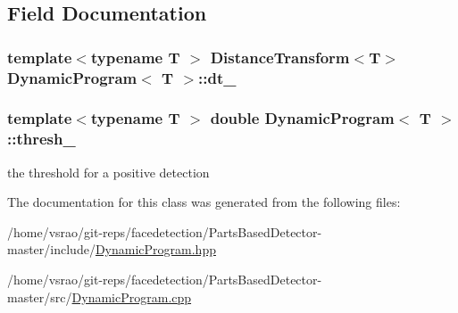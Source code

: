 \subsection{Field Documentation}
\hypertarget{classDynamicProgram_a6cea0b8559d6a03d81e2003991ab67cf}{
\subsubsection[{dt\-\_\-}]{\setlength{\rightskip}{0pt plus 5cm}template$<$typename T $>$ {\bf Distance\-Transform}$<$T$>$ {\bf Dynamic\-Program}$<$ T $>$\-::dt\-\_\-\hspace{0.3cm}{\ttfamily [private]}}}\label{classDynamicProgram_a6cea0b8559d6a03d81e2003991ab67cf}
\hypertarget{classDynamicProgram_a08f2d4801faa0f964e217b9ac9927ec6}{
\subsubsection[{thresh\-\_\-}]{\setlength{\rightskip}{0pt plus 5cm}template$<$typename T $>$ double {\bf Dynamic\-Program}$<$ T $>$\-::thresh\-\_\-\hspace{0.3cm}{\ttfamily [private]}}}\label{classDynamicProgram_a08f2d4801faa0f964e217b9ac9927ec6}


the threshold for a positive detection 



The documentation for this class was generated from the following files\-:\begin{DoxyCompactItemize}
\item 
/home/vsrao/git-\/reps/facedetection/\-Parts\-Based\-Detector-\/master/include/\hyperlink{DynamicProgram_8hpp}{Dynamic\-Program.\-hpp}\item 
/home/vsrao/git-\/reps/facedetection/\-Parts\-Based\-Detector-\/master/src/\hyperlink{DynamicProgram_8cpp}{Dynamic\-Program.\-cpp}\end{DoxyCompactItemize}
